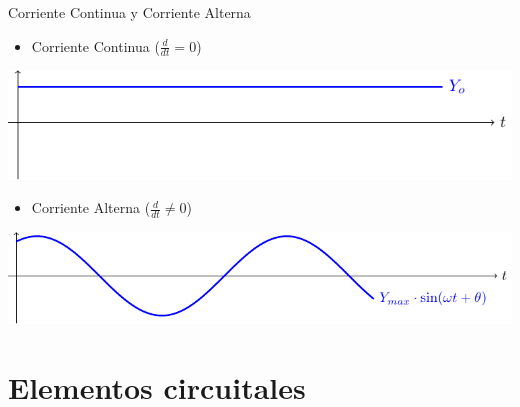 \documentclass[aspectratio=169, usenames,svgnames,dvipsnames]{beamer}
\begin{document}
\begin{frame}[label={sec:org65cad5f}]{Corriente Continua y Corriente Alterna}
\begin{itemize}
\item Corriente Continua (\(\frac{d}{dt} = 0\))
\end{itemize}
\begin{center}
\includegraphics[height=0.25\textheight]{../figs/continua.pdf}
\end{center}

\begin{itemize}
\item Corriente Alterna (\(\frac{d}{dt} \neq 0\))
\end{itemize}
\begin{center}
\includegraphics[height=0.25\textheight]{../figs/sin.pdf}
\end{center}
\end{frame}

\section{Elementos circuitales}
\label{sec:orgbb101bb}
\end{document}
